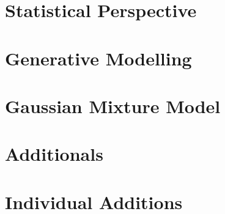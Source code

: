 \begin{multicols*}{4}
            \section{Statistical Perspective}
            
            \section{Generative Modelling}
            
            \section{Gaussian Mixture Model}
            
            \section{Additionals}
            
            \section{Individual Additions}
    \end{multicols*} 
